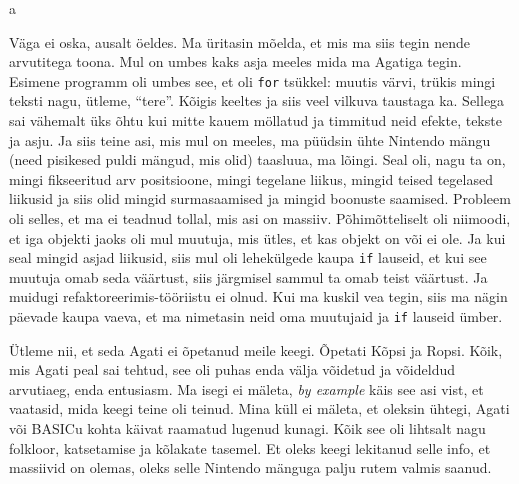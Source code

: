 a 

Väga ei oska, ausalt öeldes. Ma üritasin mõelda, et mis ma siis tegin nende 
arvutitega toona. Mul on umbes kaks asja meeles mida ma Agatiga tegin. Esimene 
programm oli umbes see, et oli \verb|for| tsükkel: muutis värvi, trükis mingi 
teksti nagu, ütleme, \enquote{tere}. Kõigis keeltes ja siis veel vilkuva 
taustaga ka. Sellega sai vähemalt üks õhtu kui mitte kauem möllatud ja timmitud 
neid efekte, tekste ja asju. Ja siis teine asi, mis mul on meeles, ma püüdsin 
ühte Nintendo mängu (need pisikesed puldi mängud, mis olid) taasluua, ma 
lõingi. Seal oli, nagu ta on, mingi fikseeritud arv positsioone, mingi tegelane 
liikus, mingid teised tegelased liikusid ja siis olid mingid surmasaamised ja 
mingid boonuste saamised. Probleem oli selles, et ma ei teadnud tollal, mis asi 
on massiiv. Põhimõtteliselt oli niimoodi, et iga objekti jaoks oli mul muutuja, 
mis ütles, et kas objekt on või ei ole. Ja kui seal mingid asjad liikusid, siis 
mul oli lehekülgede kaupa \verb|if| lauseid, et kui see muutuja omab seda 
väärtust, siis järgmisel sammul ta omab teist väärtust. Ja muidugi 
refaktoreerimis-tööriistu ei olnud. Kui ma kuskil vea tegin, siis ma nägin 
päevade kaupa vaeva, et ma nimetasin neid oma muutujaid ja \verb|if| lauseid 
ümber.



Ütleme nii, et seda Agati ei õpetanud meile keegi. Õpetati 
Kõpsi ja Ropsi. Kõik, mis Agati peal sai tehtud, see oli puhas enda välja 
võidetud ja võideldud  arvutiaeg, enda entusiasm. Ma isegi ei mäleta, \emph{by 
example} käis see asi vist, et vaatasid, mida keegi teine oli teinud. Mina küll 
ei mäleta, et oleksin ühtegi, Agati või BASICu  kohta 
käivat raamatud lugenud kunagi. Kõik see oli lihtsalt nagu folkloor, 
katsetamise ja kõlakate tasemel. Et oleks keegi lekitanud selle info, et 
massiivid on olemas, oleks selle Nintendo mänguga palju rutem valmis saanud. 

